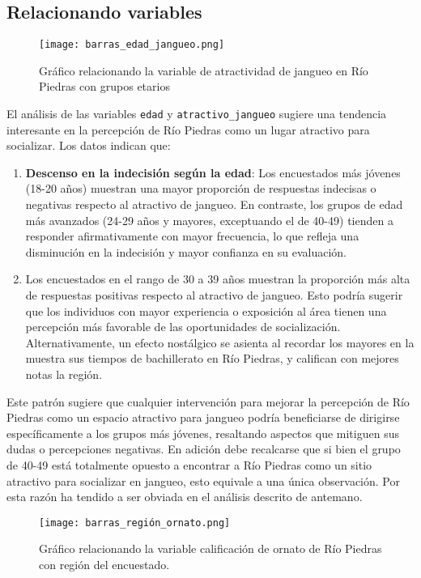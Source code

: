 \documentclass[11pt]{article}
\begin{document}
\subsection{Relacionando variables}

\begin{figure}
    \centering
    \texttt{[image: barras\_edad\_jangueo.png]}
    \caption{Gráfico relacionando la variable de atractividad de jangueo en Río Piedras con grupos etarios}
    \label{fig:edadjangueo}
\end{figure}

El análisis de las variables \texttt{edad} y \texttt{atractivo\_jangueo} sugiere una tendencia interesante en la percepción de Río Piedras como un lugar atractivo para socializar. Los datos indican que:

\begin{enumerate}
    \item 	\textbf{Descenso en la indecisión según la edad}: Los encuestados más jóvenes (18-20 años) muestran una mayor proporción de respuestas indecisas o negativas respecto al atractivo de jangueo. En contraste, los grupos de edad más avanzados (24-29 años y mayores, exceptuando el de 40-49) tienden a responder afirmativamente con mayor frecuencia, lo que refleja una disminución en la indecisión y mayor confianza en su evaluación.
    \item 	Los encuestados en el rango de 30 a 39 años muestran la proporción más alta de respuestas positivas respecto al atractivo de jangueo. Esto podría sugerir que los individuos con mayor experiencia o exposición al área tienen una percepción más favorable de las oportunidades de socialización. Alternativamente, un efecto nostálgico se asienta al recordar los mayores en la muestra sus tiempos de bachillerato en Río Piedras, y califican con mejores notas la región.
\end{enumerate}

Este patrón sugiere que cualquier intervención para mejorar la percepción de Río Piedras como un espacio atractivo para jangueo podría beneficiarse de dirigirse específicamente a los grupos más jóvenes, resaltando aspectos que mitiguen sus dudas o percepciones negativas. En adición debe recalcarse que si bien el grupo de 40-49 está totalmente opuesto a encontrar a Río Piedras como un sitio atractivo para socializar en jangueo, esto equivale a una única observación. Por esta razón ha tendido a ser obviada en el análisis descrito de antemano.

\begin{figure}
    \centering
    \texttt{[image: barras\_región\_ornato.png]}
    \caption{Gráfico relacionando la variable calificación de ornato de Río Piedras con región del encuestado.}
    \label{fig:region_ornato}
\end{figure}
\end{document}
